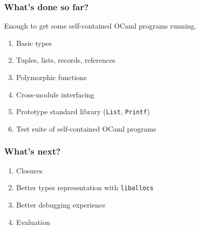 \documentclass[xcolor={usenames,dvipsnames,svgnames,table}]{beamer}
\begin{document}

\begin{frame}[fragile]
\frametitle{What's done so far?}

Enough to get some self-contained OCaml programs running.

\begin{enumerate}
  \item Basic types
  \item Tuples, lists, records, references
  \item Polymorphic functions
  \item Cross-module interfacing
  \item Prototype standard library (\lstinline{List}, \lstinline{Printf})
  \item Test suite of self-contained OCaml programs
\end{enumerate}

\end{frame}



\begin{frame}[fragile]
\frametitle{What's next?}

\begin{enumerate}
  \item Closures
  \item Better types representation with \lstinline{liballocs}
  \item Better debugging experience
  \item Evaluation
\end{enumerate}

\end{frame}




\appendix

\end{document}

